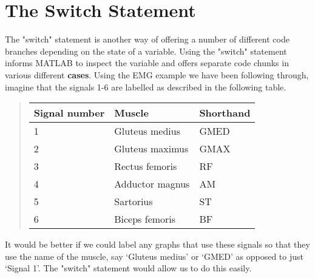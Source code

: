 \documentclass[12pt,a4paper]{article}
\begin{document}
\section{The Switch Statement}
The "switch" statement is another way of offering a number of different code branches depending on the state of a variable.  
Using the "switch" statement informs MATLAB to inspect the variable and offers separate code chunks in various different \textbf{cases}. 
Using the EMG example we have been following through, imagine that the signals 1-6 are labelled as described in the following table.

\begin{quotation}
\begin{tabular}{l l l}
\toprule
Signal number & Muscle & Shorthand \\
\midrule
1 & Gluteus medius & GMED\\
2 & Gluteus maximus & GMAX\\
3 & Rectus femoris & RF\\
4 & Adductor magnus  & AM\\
5 & Sartorius & ST\\
6 & Biceps femoris & BF\\
\bottomrule
\end{tabular}
\end{quotation}

It would be better if we could label any graphs that use these signals so that they use the name of the muscle, say `Gluteus medius' or `GMED' as opposed to just `Signal 1'.  
The "switch" statement would allow us to do this easily.
\end{document}
